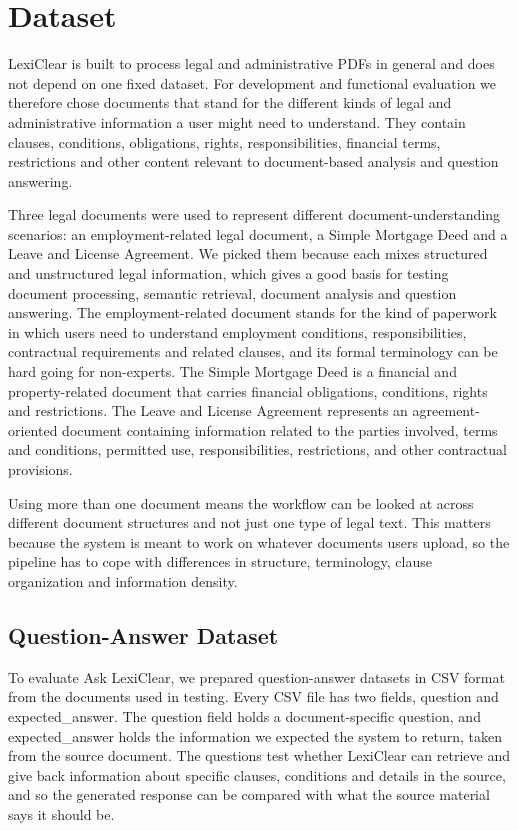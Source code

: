 \documentclass[12pt,a4paper,oneside]{report}
\begin{document}
\section{Dataset}

LexiClear is built to process legal and administrative PDFs in general and does not depend on one fixed dataset. For development and functional evaluation we therefore chose documents that stand for the different kinds of legal and administrative information a user might need to understand. They contain clauses, conditions, obligations, rights, responsibilities, financial terms, restrictions and other content relevant to document-based analysis and question answering.

Three legal documents were used to represent different document-understanding scenarios: an employment-related legal document, a Simple Mortgage Deed and a Leave and License Agreement. We picked them because each mixes structured and unstructured legal information, which gives a good basis for testing document processing, semantic retrieval, document analysis and question answering. The employment-related document stands for the kind of paperwork in which users need to understand employment conditions, responsibilities, contractual requirements and related clauses, and its formal terminology can be hard going for non-experts. The Simple Mortgage Deed is a financial and property-related document that carries financial obligations, conditions, rights and restrictions. The Leave and
License Agreement represents an agreement-oriented document containing
information related to the parties involved, terms and conditions, permitted
use, responsibilities, restrictions, and other contractual provisions.

Using more than one document means the workflow can be looked at across different document structures and not just one type of legal text. This matters because the system is meant to work on whatever documents users upload, so the pipeline has to cope with differences in structure, terminology, clause organization and information density.

\subsection{Question-Answer Dataset}

To evaluate Ask LexiClear, we prepared question-answer datasets in CSV format from the documents used in testing. Every CSV file has two fields, question and expected\_answer. The question field holds a document-specific question, and expected\_answer holds the information we expected the system to return, taken from the source document. The questions test whether LexiClear can retrieve and give back information about specific clauses, conditions and details in the source, and so the generated response can be compared with what the source material says it should be.
\end{document}
